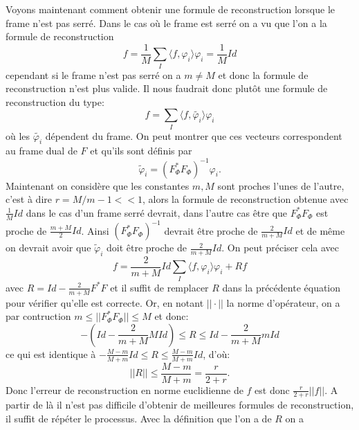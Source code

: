 Voyons maintenant comment obtenir une formule de reconstruction lorsque le frame n'est pas serré. Dans le cas où le frame est serré on a vu que l'on a la formule de reconstruction
\begin{equation}
	f= \frac{1}{M}\sum_I \langle f, \varphi_i \rangle \varphi_i = \frac{1}{M}Id
\end{equation}
cependant si le frame n'est pas serré on a $m\neq M$ et donc la formule de reconstruction n'est plus valide.
Il nous faudrait donc plutôt une formule de reconstruction du type:
\begin{equation}
	f= \sum_I \langle f, \tilde{\varphi_i} \rangle \varphi_i
\end{equation}
où les $\tilde{\varphi_i}$ dépendent du frame.
On peut montrer que ces vecteurs correspondent au frame dual de $F$ et qu'ils sont définis par
\begin{equation}
	\tilde{\varphi}_i = (F_\Phi^*F_\Phi)^{-1} \varphi_i.
\end{equation}
Maintenant on considère que les constantes $m,M$ sont proches l'unes de l'autre, c'est à dire $r=M/m - 1 <<1$, alors la formule de reconstruction obtenue avec $\frac{1}{M} Id$ dans le cas d'un frame serré devrait, dans l'autre cas être que $F_\Phi^* F_\Phi$ est proche de $\frac{m+M}{2}Id$.
Ainsi $(F_\Phi^*F_\Phi)^{-1}$ devrait être proche de $\frac{2}{m+M}Id$ et de même on devrait avoir que $\tilde{\varphi}_i$ doit être proche de $\frac{2}{m+M}Id$.
On peut préciser cela avec
\begin{equation}
	f = \frac{2}{m+M}Id \sum_I \langle f, \varphi_i \rangle \varphi_i + Rf 
\end{equation}
avec $R = Id - \frac{2}{m+M}F^*F$ et il suffit de remplacer $R$ dans la précédente équation pour vérifier qu'elle est correcte.
Or, en notant $||\cdot||$ la norme d'opérateur, on a par contruction $m \leq ||F_\Phi^*F_\Phi|| \leq  M$ et donc:
\begin{equation}
	-(Id - \frac{2}{m+M}M Id) \leq R \leq Id- \frac{2}{m+M}mId 
\end{equation}
ce qui est identique à $-\frac{M-m}{M+m}Id \leq R \leq \frac{M-m}{M+m}Id$, d'où:
\begin{equation}
	||R||\leq \frac{M-m}{M+m} = \frac{r}{2+r}.
\end{equation}
Donc l'erreur de reconstruction en norme euclidienne de $f$ est donc $\frac{r}{2+r}||f||$.
A partir de là il n'est pas difficile d'obtenir de meilleures formules de reconstruction, il suffit de répéter le processus.
Avec la définition que l'on a de $R$ on a 
